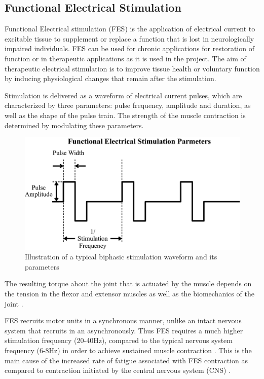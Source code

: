 




\subsection{Functional Electrical Stimulation}
Functional Electrical stimulation (FES) is the application of electrical current to excitable tissue to supplement or replace a function that is lost in neurologically impaired individuals. FES can be used for chronic applications for restoration of function or in therapeutic applications as it is used in the project. The aim of therapeutic electrical stimulation is to improve tissue health or voluntary function by inducing physiological changes that remain after the stimulation. 

Stimulation is delivered as a waveform of electrical current pulses, which are characterized by three parameters: pulse frequency, amplitude and duration, as well as the shape of the pulse train. The strength of the muscle contraction is determined by modulating these parameters.

\begin{figure} [H]
    \centering
    \includegraphics[width=0.7\linewidth]{images/stimpar.png}
    \caption{Illustration of a typical biphasic stimulation waveform and its parameters \cite{marquez-chin_functional_2020}}
    \label{fig:waveforms}
\end{figure}

The resulting torque about the joint that is actuated by the muscle depends on the tension in the flexor and extensor muscles as well as the biomechanics of the joint \cite{lynch_functional_2008}. 


FES recruits motor units in a synchronous manner, unlike an intact nervous system that recruits in an asynchronously. Thus FES requires a much higher stimulation frequency (20-40Hz), compared to the typical nervous system frequency (6-8Hz) in order to achieve sustained muscle contraction \cite{lynch_functional_2008}. This is the main cause of the increased rate of fatigue associated with FES contraction as compared to contraction initiated by the central nervous system (CNS) \cite{gilman_handbook_1983}. 

